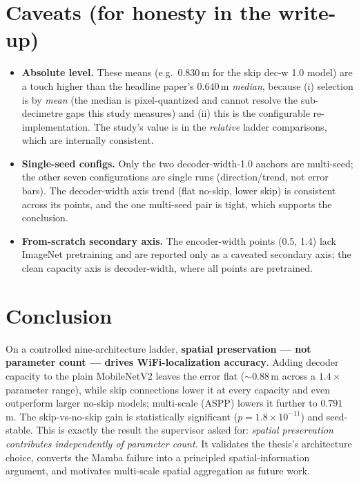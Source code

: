 \documentclass[11pt]{article}
\begin{document}
\section{Caveats (for honesty in the write-up)}
\begin{itemize}[nosep,leftmargin=1.4em]
\item \textbf{Absolute level.} These means (e.g.\ $0.830$\,m for the skip dec-w 1.0 model) are a
      touch higher than the headline paper's $0.640$\,m \emph{median}, because (i) selection is
      by \emph{mean} (the median is pixel-quantized and cannot resolve the sub-decimetre gaps
      this study measures) and (ii) this is the configurable re-implementation. The study's
      value is in the \emph{relative} ladder comparisons, which are internally consistent.
\item \textbf{Single-seed configs.} Only the two decoder-width-1.0 anchors are multi-seed; the
      other seven configurations are single runs (direction/trend, not error bars). The
      decoder-width axis trend (flat no-skip, lower skip) is consistent across its points, and
      the one multi-seed pair is tight, which supports the conclusion.
\item \textbf{From-scratch secondary axis.} The encoder-width points (0.5, 1.4) lack ImageNet
      pretraining and are reported only as a caveated secondary axis; the clean capacity axis is
      decoder-width, where all points are pretrained.
\end{itemize}

\section{Conclusion}
On a controlled nine-architecture ladder, \textbf{spatial preservation --- not parameter count ---
drives WiFi-localization accuracy}. Adding decoder capacity to the plain MobileNetV2 leaves the
error flat ($\sim\!0.88$\,m across a $1.4\times$ parameter range), while skip connections lower it
at every capacity and even outperform larger no-skip models; multi-scale (ASPP) lowers it
further to $0.791$\,m. The skip-vs-no-skip gain is statistically significant
($p=1.8\times10^{-11}$) and seed-stable. This is exactly the result the supervisor asked for:
\emph{spatial preservation contributes independently of parameter count}. It validates the
thesis's architecture choice, converts the Mamba failure into a principled spatial-information
argument, and motivates multi-scale spatial aggregation as future work.
\end{document}
